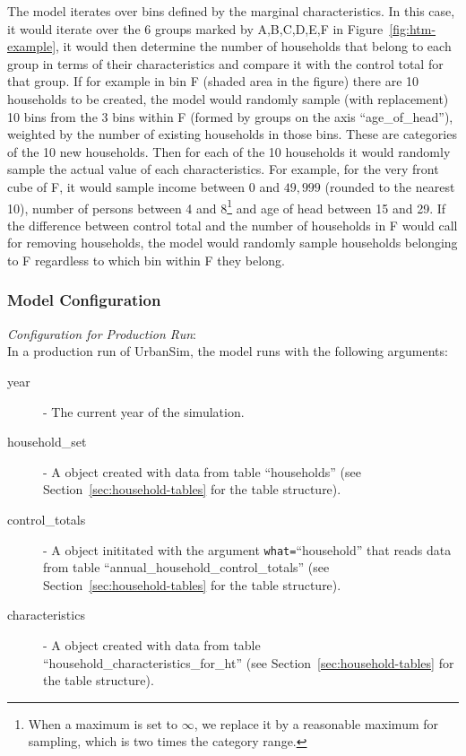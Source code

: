 The model \modelsindex iterates over bins defined by the marginal characteristics. In this
case, it would iterate over the 6 groups marked by A,B,C,D,E,F in
Figure~\ref{fig:htm-example}, it would then determine the number of households
that belong to each group in terms of their characteristics and compare it
with the control total for that group. If for example in bin F (shaded area in
the figure) there are 10 households to be created, the model \modelsindex would randomly
sample (with replacement) 10 bins from the 3 bins within F (formed by groups
on the axis ``age_of_head''), weighted by the number of existing households in
those bins.  These are categories of the 10 new households. Then for each of
the 10 households it would randomly sample the actual value of each
characteristics.  For example, for the very front cube of F, it would sample
income between 0 and $49,999$ (rounded to the nearest 10), number of persons
between 4 and 8\footnote{When a maximum is set to $\infty$, we replace it by a
  reasonable maximum for sampling, which is two times the category range.}
and age of head between 15 and 29.  If the difference between control total
and the number of households in F would call for removing households, the
model \modelsindex would randomly sample households belonging to F regardless to which bin
within F they belong.

\subsubsection{Model Configuration}
\modelsindex
%
{\em Configuration for Production Run}:\\[1mm]
In a production run of UrbanSim, the model \modelsindex runs with the following arguments:
\begin{description}
\item[year] - The current year of the simulation.
\item[household_set] - A  object created with data from
  table ``households'' (see Section~\ref{sec:household-tables}
  for the table structure).
\item[control_totals] - A  object inititated with the
  argument \verb|what=|``household'' that reads data from table
  ``annual_household_control_totals'' (see Section~\ref{sec:household-tables}
  for the table structure).
\item[characteristics] - A  object created
  with data from table ``household_characteristics_for_ht'' (see
  Section~\ref{sec:household-tables} for the table structure).
\end{description}

